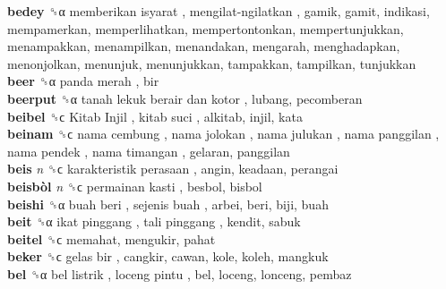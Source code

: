 \textbf{bedey} ␝α   memberikan isyarat ,  mengilat-ngilatkan , gamik, gamit, indikasi, mempamerkan, memperlihatkan, mempertontonkan, mempertunjukkan, menampakkan, menampilkan, menandakan, mengarah, menghadapkan, menonjolkan, menunjuk, menunjukkan, tampakkan, tampilkan, tunjukkan  \\
\textbf{beer} ␝α   panda merah , bir  \\
\textbf{beerput} ␝α   tanah lekuk berair dan kotor , lubang, pecomberan  \\
\textbf{beibel} ␝ϲ   Kitab Injil ,  kitab suci , alkitab, injil, kata  \\
\textbf{beinam} ␝ϲ   nama cembung ,  nama jolokan ,  nama julukan ,  nama panggilan ,  nama pendek ,  nama timangan , gelaran, panggilan  \\
\textbf{beis} \emph{n}  ␝ϲ   karakteristik perasaan , angin, keadaan, perangai  \\
\textbf{beisbòl} \emph{n}  ␝ϲ   permainan kasti , besbol, bisbol  \\
\textbf{beishi} ␝α   buah beri ,  sejenis buah , arbei, beri, biji, buah  \\
\textbf{beit} ␝α   ikat pinggang ,  tali pinggang , kendit, sabuk  \\
\textbf{beitel} ␝ϲ  memahat, mengukir, pahat  \\
\textbf{beker} ␝ϲ   gelas bir , cangkir, cawan, kole, koleh, mangkuk  \\
\textbf{bel} ␝α   bel listrik ,  loceng pintu , bel, loceng, lonceng, pembaz  \\
